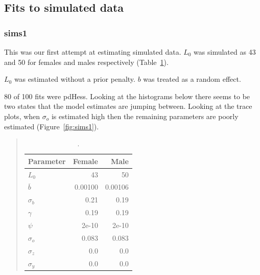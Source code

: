 \documentclass[11pt, a4paper]{article}
\begin{document}
\newpage\clearpage
\subsection{Fits to simulated data}

\subsubsection{sims1}
This was our first attempt at estimating simulated data.  $L_0$ was simulated
as 43 and 50 for females and males respectively (Table~\ref{tab:sims1}).

$L_0$ was estimated without a prior penalty.  $b$ was treated as a random
effect.

80 of 100 fits were pdHess.  Looking at the histograms below there seems to be
two states that the model estimates are jumping between.  Looking at the trace
plots, when $\sigma_o$ is estimated high then the remaining parameters are
poorly estimated (Figure~\ref{fig:sims1}).
\begin{table}[!htbp]
  \begin{quote}
    \caption{\label{tab:sims1} .} \small{
      \begin{center}
        \begin{tabular}{lrr}
          \hline
          Parameter      & Female & Male\\
          \hline
          $L_0$          & 43   & 50\\
          $\overline{b}$ & 0.00100 & 0.00106\\
          $\sigma_b$     & 0.21 & 0.19\\
          $\gamma$       & 0.19   & 0.19\\
          $\psi$         & 2e-10 & 2e-10\\
          $\sigma_o$     & 0.083 & 0.083\\
          $\sigma_z$     & 0.0   & 0.0\\
          $\sigma_y$     & 0.0   & 0.0\\
          \hline
        \end{tabular}
      \end{center}
    }
  \end{quote}
\end{table}
\end{document}
